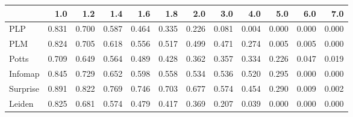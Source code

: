 \begin{tabular}{lrrrrrrrrrrr}
\toprule
{} &   1.0 &   1.2 &   1.4 &   1.6 &   1.8 &   2.0 &   3.0 &   4.0 &   5.0 &   6.0 &   7.0 \\
\midrule
PLP      & 0.831 & 0.700 & 0.587 & 0.464 & 0.335 & 0.226 & 0.081 & 0.004 & 0.000 & 0.000 & 0.000 \\
PLM      & 0.824 & 0.705 & 0.618 & 0.556 & 0.517 & 0.499 & 0.471 & 0.274 & 0.005 & 0.005 & 0.000 \\
Potts    & 0.709 & 0.649 & 0.564 & 0.489 & 0.428 & 0.362 & 0.357 & 0.334 & 0.226 & 0.047 & 0.019 \\
Infomap  & 0.845 & 0.729 & 0.652 & 0.598 & 0.558 & 0.534 & 0.536 & 0.520 & 0.295 & 0.000 & 0.000 \\
Surprise & 0.891 & 0.822 & 0.769 & 0.746 & 0.703 & 0.677 & 0.574 & 0.454 & 0.290 & 0.009 & 0.002 \\
Leiden   & 0.825 & 0.681 & 0.574 & 0.479 & 0.417 & 0.369 & 0.207 & 0.039 & 0.000 & 0.000 & 0.000 \\
\bottomrule
\end{tabular}
